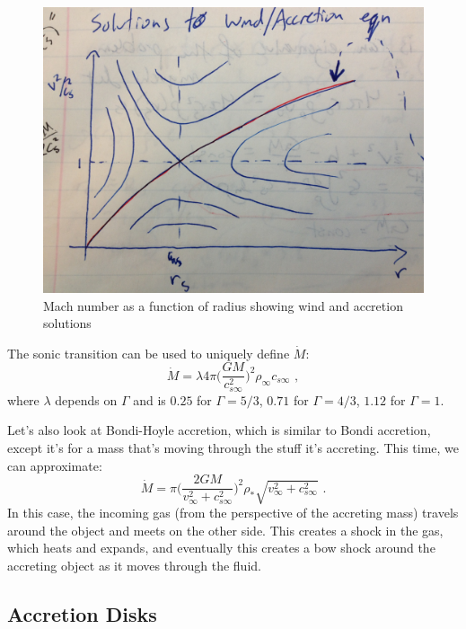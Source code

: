 \begin{figure}[!h]
\begin{center}
\includegraphics[width=\textwidth]{mach.jpg}
\caption{Mach number as a function of radius showing wind and accretion solutions \label{f:mach}}
\end{center}
\end{figure}

The sonic transition can be used to uniquely define $\dot{M}$:
\begin{equation}
\dot{M} = \lambda 4 \pi \biggl( \frac{G M}{c_{s \infty}^2} \biggr) ^2 \rho_\infty c_{s \infty}\,\, ,
\end{equation}
where $\lambda$ depends on $\Gamma$ and is $0.25$ for $\Gamma = 5/3$, $0.71$ for $\Gamma = 4/3$, $1.12$ for $\Gamma = 1$.

Let's also look at Bondi-Hoyle accretion, which is similar to Bondi accretion, except it's for a mass that's moving through the stuff it's accreting. This time, we can approximate:
\begin{equation}
\dot{M} = \pi \biggl(\frac{2 G M}{v_\infty ^2 + c_{s \infty}^2} \biggr)^2 \rho_* \sqrt{v_\infty ^2 + c_{s \infty}^2}\,\, .
\end{equation}
In this case, the incoming gas (from the perspective of the accreting mass) travels around the object and meets on the other side. This creates a shock in the gas, which heats and expands, and eventually this creates a bow shock around the accreting object as it moves through the fluid.

\subsection{Accretion Disks}

